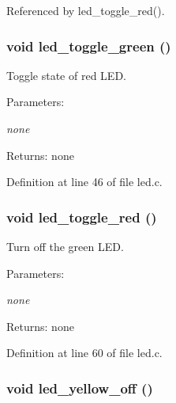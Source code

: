 Referenced by led\_\-toggle\_\-red().
\subsubsection{\setlength{\rightskip}{0pt plus 5cm}void led\_\-toggle\_\-green ()}\label{led_8c_c1c7150a1df4b7fc5800cbe642a70812}


Toggle state of red LED. 

\begin{Desc}
\item[Parameters:]
\begin{description}
\item[{\em none}]\end{description}
\end{Desc}
\begin{Desc}
\item[Returns:]none \end{Desc}


Definition at line 46 of file led.c.
\subsubsection{\setlength{\rightskip}{0pt plus 5cm}void led\_\-toggle\_\-red ()}\label{led_8c_2bb924e68be183ef7b4d50f88c25e9cc}


Turn off the green LED. 

\begin{Desc}
\item[Parameters:]
\begin{description}
\item[{\em none}]\end{description}
\end{Desc}
\begin{Desc}
\item[Returns:]none \end{Desc}


Definition at line 60 of file led.c.
\subsubsection{\setlength{\rightskip}{0pt plus 5cm}void led\_\-yellow\_\-off ()}\label{led_8c_5e8ab2681b60fc4b1fa8a855152ada4c}



